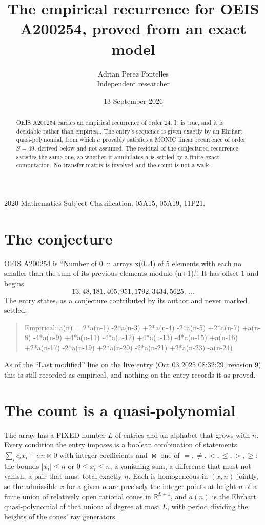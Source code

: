 \documentclass[11pt,a4paper]{article}
\title{The empirical recurrence for OEIS A200254, proved from an exact model}
\author{Adrian Perez Fontelles\\ \small Independent researcher}
\date{13 September 2026}
\theoremstyle{plain}
\theoremstyle{definition}
\begin{document}
\maketitle

\begin{abstract}
OEIS A200254 carries an empirical recurrence of order $24$. It is true, and it is
decidable rather than empirical. The entry's sequence is given exactly by an Ehrhart quasi-polynomial, from
which $a$ provably satisfies a MONIC linear recurrence of order $S=49$, derived below and not
assumed. The residual of the conjectured recurrence satisfies the same one, so whether it
annihilates $a$ is settled by a finite exact computation. No transfer matrix is involved and
the count is not a walk.
\end{abstract}

\noindent\small 2020 Mathematics Subject Classification. 05A15, 05A19, 11P21.\normalsize

\section{The conjecture}

OEIS A200254 is ``Number of 0..n arrays x(0..4) of 5 elements with each no smaller than the sum of its previous elements modulo (n+1).''. It has offset $1$ and begins
\[
13, 48, 181, 405, 951, 1792, 3434, 5625,\ \dots
\]
The entry states, as a conjecture contributed by its author and never marked settled:
\begin{quote}
Empirical: a(n) = 2*a(n-1) -2*a(n-3) +2*a(n-4) -2*a(n-5) +2*a(n-7) +a(n-8) -4*a(n-9) +4*a(n-11) -4*a(n-12) +4*a(n-13) -4*a(n-15) +a(n-16) +2*a(n-17) -2*a(n-19) +2*a(n-20) -2*a(n-21) +2*a(n-23) -a(n-24)
\end{quote}
As of the ``Last modified'' line on the live entry (Oct 03 2025 08:32:29, revision 9)
this is still recorded as empirical, and nothing on the entry records it as proved.

\section{The count is a quasi-polynomial}

The array has a FIXED number $L$ of entries and an alphabet that grows with $n$. Every
condition the entry imposes is a boolean combination of statements
$\sum_i c_ix_i + c\,n \bowtie 0$ with integer coefficients and $\bowtie$ one of
$=,\ne,<,\le,>,\ge$: the bounds $|x_i|\le n$ or $0\le x_i\le n$, a vanishing sum, a difference
that must not vanish, a pair that must total exactly $n$. Each is homogeneous in $(x,n)$
jointly, so the admissible $x$ for a given $n$ are precisely the integer points at height $n$
of a finite union of relatively open rational cones in $\mathbb{R}^{L+1}$, and $a(n)$ is
the Ehrhart quasi-polynomial of that union: of degree at most $L$, with period dividing the
heights of the cones' ray generators.
\end{document}

